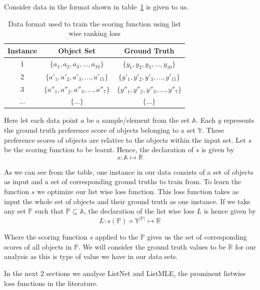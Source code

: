 \documentclass[12pt, twoside, ngerman]{report}
\begin{document}
Consider data in the format shown in table~\ref{tab:dataformat} is given to us.

\begin{table} [ht]
\centering
\begin{tabular}{ | c | c | c | }
  \toprule
  Instance & Object Set & Ground Truth \\ \midrule
  1 & $\{a_1, a_2, a_3, ... , a_{10}\}$  & $\{y_1, y_2, y_3, ... , y_{10}\}$  \\
  2 & $\{a'_1, a'_2, a'_3, ... , a'_{15}\}$ & $\{y'_1, y'_2, y'_3, ... , y'_{15}\}$  \\
  3 & $\{a''_1, a''_2, a''_3, ... , a''_{7}\}$ & $\{y''_1, y''_2, y''_3, ... , y''_{7}\}$  \\
  ... & $\{...\}$ & $\{...\}$ \\
  \bottomrule
\end{tabular}
\caption{Data format used to train the scoring function using list wise ranking loss}
\label {tab:dataformat}
\end{table}
Here let each data point $a$ be a sample/element from the set $\mathbb{A}$.
Each $y$ represents the ground truth preference score of objects belonging to a set $\mathbb{Y}$.
These preference scores of objects are relative to the objects within the input set.
Let $s$ be the scoring function to be learnt.
Hence, the declaration of $s$ is given by
$$
s : \mathbb{A} \mapsto \mathbb{R}
$$

As we can see from the table,  one instance in our data consists of a set of objects as input and a set of corresponding ground truths to train from.
To learn the function $s$ we optimize our list wise loss function.
This loss function takes as input the whole set of objects and their ground truth as one instance.
If we take any set $\mathbb{P}$ such that $\mathbb{P} \subseteq \mathbb{A}$,  the declaration of the list wise loss $L$ is hence given by
\begin{equation}
L : s(\mathbb{P}) \times \mathbb{Y}^{|\mathbb{P}|} \mapsto \mathbb{R}
\end{equation}

Where the scoring function $s$ applied to the $\mathbb{P}$ gives us the set of corresponding scores of all objects in $\mathbb{P}$.
We will consider the ground truth values to be $\mathbb{R}$ for our analysis as this is type of value
we have in our data sets.

In the next 2 sections we analyse ListNet and ListMLE,  the prominent listwise loss functions in the literature.
\end{document}
